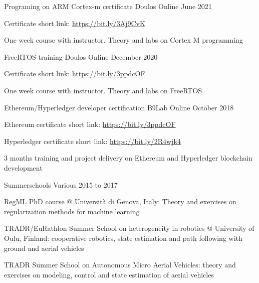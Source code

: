 \vspace*{4pt}

\cventry
{Programing on ARM Cortex-m certificate} %
{Doulos} %
{Online} %
{June 2021} %
{
  \begin{cvitems} %
    \item{Certificate short link: \url{https://bit.ly/3Aj9CvK}}
  \end{cvitems}
  \vspace{16pt}
  \begin{cvparagraph}
    One week course with instructor. Theory and labs on Cortex M programming
  \end{cvparagraph}
  \vspace*{-25pt}
}
\cventry
{FreeRTOS training} %
{Doulos} %
{Online} %
{December 2020} %
{
  \begin{cvitems} %
    \item{Certificate short link: \url{https://bit.ly/3ppdcOF}}
  \end{cvitems}
  \vspace{16pt}
  \begin{cvparagraph}
    One week course with instructor. Theory and labs on FreeRTOS
  \end{cvparagraph}
  \vspace*{-20pt}
}
\cventry
{Ethereum/Hyperledger developer certification} %
{B9Lab} %
{Online} %
{October 2018} %
{
  \begin{cvitems} %
    \item{Ethereum certificate short link: \url{https://bit.ly/3ppdcOF}}
    \item{Hyperledger certificate short link: \url{https://bit.ly/2R4wjk4}}
  \end{cvitems}
  \vspace{16pt}
  \begin{cvparagraph}
    3 months training and project delivery on Ethereum and Hyperledger blockchain development
  \end{cvparagraph}
  \vspace*{-20pt}
}
\cventry
{Summerschools} %
{Various} %
{} %
{2015 to 2017} %
{
  \begin{cvitems} %
    \item{RegML PhD course @ Università di Genova, Italy: Theory and exercises on regularization methods for machine learning}
    \item{TRADR/EuRathlon Summer School on heterogeneity in robotics @ University of Oulu, Finland: cooperative robotics, state estimation and path following with ground and aerial vehicles}
    \item{TRADR Summer School on Autonomous Micro Aerial Vehicles: theory and exercises on modeling, control and state estimation of aerial vehicles}
  \end{cvitems}
  \vspace*{15pt}
}
